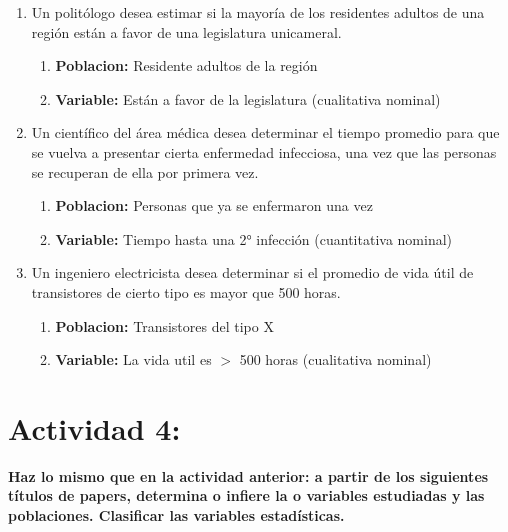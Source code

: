 \documentclass[12pt, letterpaper]{article}
\begin{document}
\begin{enumerate}
    \item Un politólogo desea estimar si la mayoría de los residentes adultos de una región están a favor de una legislatura unicameral.
        \begin{enumerate}
            \item \textbf{Poblacion:} Residente adultos de la región
            \item \textbf{Variable:} Están a favor de la legislatura (cualitativa nominal) \\
        \end{enumerate}

    \item Un científico del área médica desea determinar el tiempo promedio para que se vuelva a presentar cierta enfermedad infecciosa, una vez que las personas se recuperan de ella por primera vez.
        \begin{enumerate}
            \item \textbf{Poblacion:} Personas que ya se enfermaron una vez
            \item \textbf{Variable:} Tiempo hasta una 2° infección (cuantitativa nominal) \\
        \end{enumerate}

    \item Un ingeniero electricista desea determinar si el promedio de vida útil de transistores de cierto tipo es mayor que 500 horas.
        \begin{enumerate}
            \item \textbf{Poblacion:} Transistores del tipo X
            \item \textbf{Variable:} La vida util es $>$ 500 horas (cualitativa nominal) \\
        \end{enumerate}
\end{enumerate}

\section{Actividad 4:}
\textbf{Haz lo mismo que en la actividad anterior: a partir de los siguientes títulos de papers, determina o infiere la o variables estudiadas y las poblaciones. Clasificar las variables estadísticas.}
\end{document}
